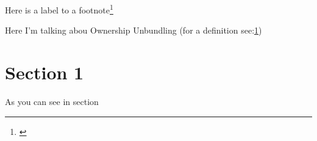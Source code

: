 \documentclass[paper=4a]{scrreprt}
\begin{document}
Here is a label to a footnote\footnote{\label{foot:Ownership_Unbundling}}


Here I'm talking abou Ownership Unbundling (for a definition see:\textsf{\textcolor{MidnightBlue}{\ref{foot:Ownership_Unbundling}}})


\section[Name of the section to be used by the reference]{Section 1}\label{sec:Section1}

As you can see in section \textsf{}
\end{document}
